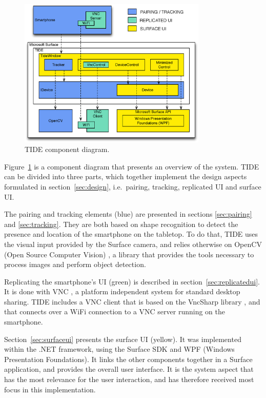 \begin{figure}[htb]
  \centering
    \includegraphics[width=0.8\textwidth]{images/overviewNew}
    \caption{TIDE component diagram.}
    \label{fig:overview}
\end{figure}

Figure~\ref{fig:overview} is a component diagram that presents an overview of the system.
TIDE can be divided into three parts, which together implement the design aspects formulated in section~\ref{sec:design}, i.e.\ pairing, tracking, replicated UI and surface UI.

The pairing and tracking elements (blue) are presented in sections \ref{sec:pairing} and \ref{sec:tracking}.
They are both based on shape recognition to detect the presence and location of the smartphone on the tabletop.
To do that, TIDE uses the visual input provided by the Surface camera, and relies otherwise on OpenCV (Open Source Computer Vision) \citeyearpar{opencv}, a library that provides the tools necessary to process images and perform object detection.

Replicating the smartphone's UI (green) is described in section~\ref{sec:replicatedui}.
It is done with VNC \citep{Richardson:1998:vnc}, a platform independent system for standard desktop sharing.
TIDE includes a VNC client that is based on the VncSharp library \citep{vncsharp}, and that connects over a WiFi connection to a VNC server running on the smartphone.

Section~\ref{sec:surfaceui} presents the surface UI (yellow).
It was implemented within the .NET framework, using the Surface SDK and WPF (Windows Presentation Foundations).
It links the other components together in a Surface application, and provides the overall user interface.
It is the system aspect that has the most relevance for the user interaction, and has therefore received most focus in this implementation.

